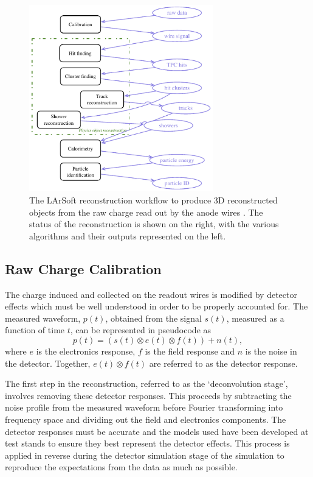 \begin{figure}
  \centering
  \includegraphics[width=8cm]{ReconstructionWorkflow.pdf}
  \caption[The LArSoft reconstruction workflow to produce 3D reconstructed objects from the raw charge read out by the anode wires.]{The LArSoft reconstruction workflow to produce 3D reconstructed objects from the raw charge read out by the anode wires \cite{LArSoft2016}.  The status of the reconstruction is shown on the right, with the various algorithms and their outputs represented on the left.}
  \label{fig:ReconstructionWorkflow}
\end{figure}

\subsection{Raw Charge Calibration}\label{sec:HitReconstruction}

The charge induced and collected on the readout wires is modified by detector effects which must be well understood in order to be properly accounted for.  The measured waveform, $p(t)$, obtained from the signal $s(t)$, measured as a function of time $t$, can be represented in pseudocode as
\begin{equation}
  p(t) = \left( s(t) \otimes e(t) \otimes f(t) \right) + n(t),
\end{equation}
where $e$ is the electronics response, $f$ is the field response and $n$ is the noise in the detector.  Together, $e(t) \otimes f(t)$ are referred to as the detector response.

The first step in the reconstruction, referred to as the `deconvolution stage', involves removing these detector responses.  This proceeds by subtracting the noise profile from the measured waveform before Fourier transforming into frequency space and dividing out the field and electronics components.  The detector responses must be accurate and the models used have been developed at test stands to ensure they best represent the detector effects.  This process is applied in reverse during the detector simulation stage of the simulation to reproduce the expectations from the data as much as possible.

